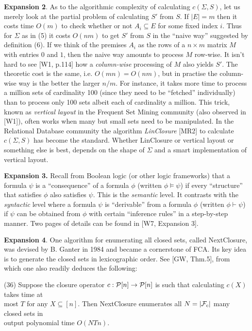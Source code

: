 \documentclass[11pt]{article}
\newcommand{\ra}{\rightarrow}
\begin{document}
{\bf Expansion 2}. As to the algorithmic complexity of calculating $c(\Sigma, S)$, let us merely look at the partial problem of calculating $S'$ from $S$. If $|E| = m$ then it costs time $O(m)$ to check whether or not $A_i \subseteq E$ for some fixed index $i$. Thus for $\Sigma$ as in (5) it costs $O(nm)$ to get $S'$ from $S$ in the ``naive way'' suggested by definition (6). If we think of the premises $A_i$ as the rows of a $n \times m$ matrix $M$ with entries $0$ and $1$, then the naive way amounts to process $M$ row-wise. It isn't hard to see [W1, p.114] how a {\it column-wise} processing of $M$ also yields $S'$. The theoretic cost is the same, i.e. $O(mn) = O(nm)$, but in practise the column-wise way is the better the larger $n/m$. For instance, it takes more time to process a million sets of cardinality 100 (since they need to be ``fetched'' individually) than to process only 100 sets albeit each of cardinality a million. This trick, known as {\it vertical layout} in the Frequent Set Mining community (also observed in [W1]), often works when many but small sets need to be manipulated. In the Relational Database community the algorithm {\it LinClosure} [MR2] to calculate $c(\Sigma, S)$ has become the standard. Whether LinClosure or vertical layout or something else is best, depends on the shape of $\Sigma$ and a smart implementation of vertical layout. 


{\bf Expansion 3.} Recall from Boolean logic (or other logic frameworks) that a formula $\psi$ is a ``consequence'' of a formula $\phi$ (written $\phi \vDash \psi$) if every ``structure'' that satisfies $\phi$ also satisfies $\psi$. This is the {\it semantic} level. It contrasts with the {\it syntactic} level where a formula $\psi$ is ``derivable'' from a formula $\phi$ (written $\phi \vdash \psi$) if $\psi$ can be obtained from $\phi$ with certain ``inference rules'' in a step-by-step manner. Two pages of details can be found in [W7, Expansion 3].



{\bf Expansion 4}. One algorithm for enumerating all closed sets, called NextClosure, was devised by B. Ganter in 1984 and became a cornerstone of FCA. Its key idea is to generate the closed sets in lexicographic order. See [GW, Thm.5], from which one also readily deduces the following:

(36) \quad Suppose the closure operator $c: {\cal P}[n] \ra {\cal P}[n]$ is such that calculating $c(X)$ takes time at\\
\hspace*{.9cm} most $T$ for any $X \subseteq [n]$. Then NextClosure enumerates all $N = |{\cal F}_c|$ many closed sets in\\
\hspace*{.9cm} output polynomial time $O(NTn)$.
\end{document}

